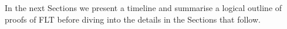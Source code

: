\documentclass{article}
\theoremstyle{definition}
\theoremstyle{definition}
\theoremstyle{definition}
\begin{document}
In the next Sections we present a timeline and summarise a logical outline of proofs of FLT before diving into the details in the Sections that follow.






\end{document}
